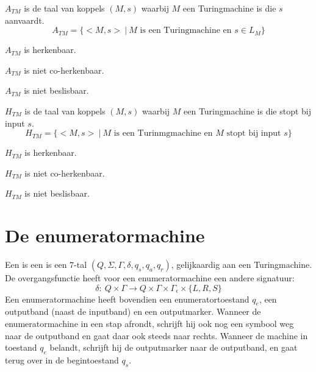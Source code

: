 \documentclass[main.tex]{subfiles}
\begin{document}
\begin{de}
  \label{de:a-tm}
  $A_{TM}$ is de taal van koppels $(M,s)$ waarbij $M$ een Turingmachine is die $s$ aanvaardt.
  \[ A_{TM} = \{ <M,s> \ |\ M \text{ is een Turingmachine en } s \in L_{M} \} \]
\end{de}

\begin{st}
  $A_{TM}$ is herkenbaar.
\end{st}

\begin{st}
  $A_{TM}$ is niet co-herkenbaar.
\end{st}

\begin{gev}
  $A_{TM}$ is niet beslisbaar.
\end{gev}

\begin{de}
  $H_{TM}$ is de taal van koppels $(M,s)$ waarbij $M$ een Turingmachine is die stopt bij input $s$.
  \[ H_{TM} = \{ <M,s> \ |\ M \text{ is een Turinmgmachine en } M \text{ stopt bij input } s \} \]
\end{de}

\begin{st}
  $H_{TM}$ is herkenbaar.
\end{st}

\begin{st}
  $H_{TM}$ is niet co-herkenbaar.
\end{st}

\begin{gev}
  $H_{TM}$ is niet beslisbaar.

\end{gev}

\section{De enumeratormachine}
\label{sec:de-enumeratormachine}

\begin{de}
  Een  is een is een $7$-tal $(Q,\Sigma,\Gamma, \delta, q_{s}, q_{a}, q_{r})$, gelijkaardig aan een Turingmachine.
  De overgangsfunctie heeft voor een enumeratormachine een andere signatuur:
  \[ \delta:\ Q \times \Gamma \rightarrow Q \times \Gamma \times \Gamma_{\epsilon}\times \{L,R,S\} \]
  Een enumeratormachine heeft bovendien een enumeratortoestand $q_{e}$, een outputband (naast de inputband) en een outputmarker.
  Wanneer de enumeratormachine in een stap afrondt, schrijft hij ook nog een symbool weg naar de outputband en gaat daar ook steeds naar rechts. Wanneer de machine in toestand $q_{e}$ belandt, schrijft hij de outputmarker naar de outputband, en gaat terug over in de begintoestand $q_{s}$.
\end{de}
\end{document}
